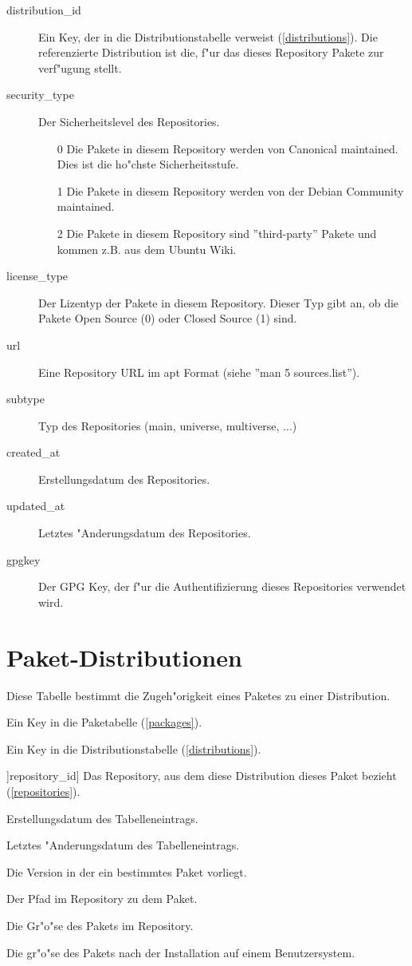 \documentclass{article}
\begin{document}
\begin{description}
\item[distribution\_id] Ein Key, der in die Distributionstabelle verweist (\ref{distributions}). Die referenzierte Distribution ist die, f"ur das dieses Repository Pakete zur verf"ugung stellt.
\item[security\_type] Der Sicherheitslevel des Repositories. 
    \begin{enumerate}
    \item[0] Die Pakete in diesem Repository werden von Canonical maintained. Dies ist die ho"chste Sicherheitsstufe.
    \item[1] Die Pakete in diesem Repository werden von der Debian Community maintained. 
    \item[2] Die Pakete in diesem Repository sind ''third-party'' Pakete und kommen z.B. aus dem Ubuntu Wiki.
    \end{enumerate}
\item[license\_type] Der Lizentyp der Pakete in diesem Repository. Dieser Typ gibt an, ob die Pakete Open Source (0) oder Closed Source (1) sind.
\item[url] Eine Repository URL im apt Format (siehe ''man 5 sources.list'').
\item[subtype] Typ des Repositories (main, universe, multiverse, ...)
\item[created\_at] Erstellungsdatum des Repositories.
\item[updated\_at] Letztes "Anderungsdatum des Repositories.
\item[gpgkey] Der GPG Key, der f"ur die Authentifizierung dieses Repositories verwendet wird.
\end{description}

\section{Paket-Distributionen}

Diese Tabelle bestimmt die Zugeh"origkeit eines Paketes zu einer Distribution.

\begin{description}
\item[package\_id] Ein Key in die Paketabelle (\ref{packages}).
\item[distribution\_id] Ein Key in die Distributionstabelle (\ref{distributions}).
\item]repository\_id] Das Repository, aus dem diese Distribution dieses Paket bezieht (\ref{repositories}).
\item[created\_at] Erstellungsdatum des Tabelleneintrags.
\item[updated\_at] Letztes "Anderungsdatum des Tabelleneintrags.
\item[version] Die Version in der ein bestimmtes Paket vorliegt.
\item[filename] Der Pfad im Repository zu dem Paket.
\item[size] Die Gr"o"se des Pakets im Repository.
\item[installedsize] Die gr"o"se des Pakets nach der Installation auf einem Benutzersystem.
\end{description}
\end{document}
